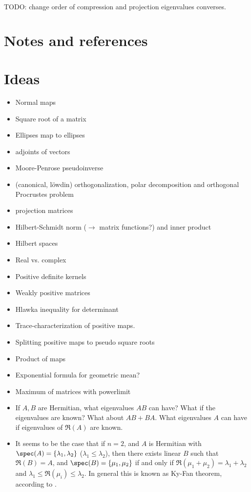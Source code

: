 TODO: change order of compression and projection eigenvalues converses.

\section{Notes and references}

\section{Ideas}

\begin{itemize}
	\item Normal maps
	\item Square root of a matrix
	\item Ellipses map to ellipses
	\item adjoints of vectors
	\item Moore-Penrose pseudoinverse
	\item (canonical, löwdin) orthogonalization, polar decomposition and orthogonal Procrustes problem
	\item projection matrices
	\item Hilbert-Schmidt norm ($\to$ matrix functions?) and inner product
	\item Hilbert spaces
	\item Real vs. complex
	\item Positive definite kernels
	\item Weakly positive matrices
	\item Hlawka inequality for determinant %
	\item Trace-characterization of positive maps.
	\item Splitting positive maps to pseudo square roots
	\item Product of maps
	\item Exponential formula for geometric mean?
	\item Maximum of matrices with powerlimit
	\item If $A, B$ are Hermitian, what eigenvalues $AB$ can have? What if the eigenvalues are known? What about $AB + BA$. What eigenvalues $A$ can have if eigenvalues of $\Re(A)$ are known.
	\item It seems to be the case that if $n = 2$, and $A$ is Hermitian with $\spec(A) = \{\lambda_{1}, \lambda_{2}\}$ ($\lambda_{1} \leq \lambda_{2}$), then there exists linear $B$ such that $\Re(B) = A$, and $\spec(B) = \{\mu_{1}, \mu_{2} \}$ if and only if $\Re(\mu_{1} + \mu_{2}) = \lambda_{1} + \lambda_{2}$ and $\lambda_{1} \leq \Re(\mu_{i}) \leq \lambda_{2}$. In general this is known as Ky-Fan theorem, according to \cite{Ando3}.

\end{itemize}

